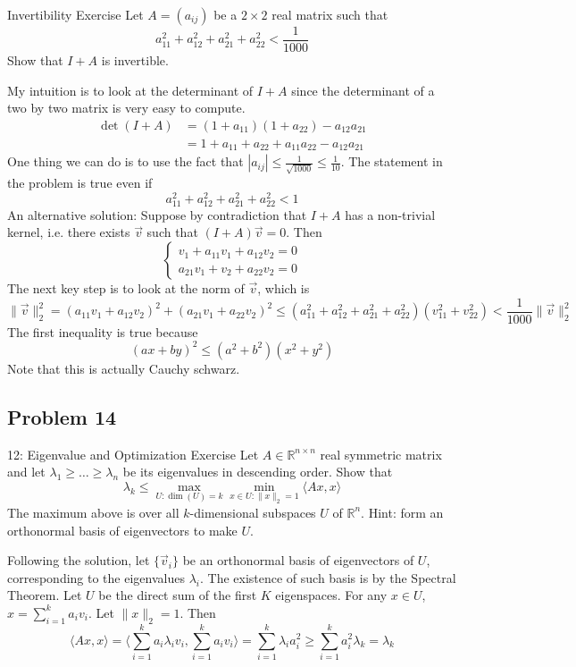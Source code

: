 \documentclass[../main]{subfiles}
\begin{document}
\begin{bbox}{Invertibility Exercise}
    Let $A = (a_{ij})$ be a $2\times 2$ real matrix such that 
    \[
    a_{11}^2 + a_{12}^2 + a_{21}^2 + a_{22}^2 < \frac{1}{1000}
    \]
    Show that $I + A$ is invertible.
\end{bbox}
\begin{solution}
    My intuition is to look at the determinant of $I + A$ since the determinant of a two by two matrix is very easy to compute.
    \begin{align*}
    \det(I+A) &= (1+a_{11})(1+a_{22})-a_{12}a_{21}\\
    &=1 + a_{11}+ a_{22}+a_{11}a_{22}-a_{12}a_{21}
    \end{align*}
    One thing we can do is to use the fact that $|a_{ij}|\leq \frac{1}{\sqrt{1000}}\le \frac{1}{10}$. The statement in the problem is true even if \[
     a_{11}^2 + a_{12}^2 + a_{21}^2 + a_{22}^2 < 1
    \]
    \newline
    An alternative solution: Suppose by contradiction that $I+A$ has a non-trivial kernel, i.e. there exists $\vec v$ such that $(I+A)\vec v = 0$. Then 
    \[
    \begin{cases}
        v_1 + a_{11} v_1 + a_{12}v_2 = 0\\
        a_{21}v_1 + v_2 + a_{22}v_2 = 0
    \end{cases}
    \]
    The next key step is to look at the norm of $\vec v$, which is 
    \[
    \|\vec v\|^2_2 = (a_{11}v_1 + a_{12}v_2)^2 +(a_{21}v_1 + a_{22}v_2)^2 \leq (a_{11}^2 + a_{12}^2 + a_{21}^2 + a_{22}^2)(v_{11}^2 + v_{22}^2) < \frac{1}{1000}\|\vec v\|_2^2
    \]
    The first inequality is true because 
    \[
    (ax+by)^2 \leq (a^2+b^2)(x^2+y^2)
    \]
    Note that this is actually Cauchy schwarz.
\end{solution}

\subsection{Problem 14}

\begin{bbox}{12: Eigenvalue and Optimization Exercise}
    Let $A\in \mathbb R^{n\times n}$ real symmetric matrix and let $\lambda_1\ge \dots \ge \lambda_n$ be its eigenvalues in descending order. Show that 
    \[
    \lambda_k \le \max_{U: \dim(U) = k}\min_{x\in U: \|x\|_2 = 1} \langle Ax, x\rangle
    \]
    The maximum above is over all $k$-dimensional subspaces $U$ of $\mathbb R^n$. Hint: form an orthonormal basis of eigenvectors to make $U$.
\end{bbox}
\begin{solution}
    Following the solution, let $\{\vec v_i\}$ be an orthonormal basis of eigenvectors of $U$, corresponding to the eigenvalues $\lambda_i$. The existence of such basis is by the Spectral Theorem.
    Let $U$ be the direct sum of the first $K$ eigenspaces. For any $x\in U$, $x = \sum_{i=1}^k a_i v_i$.
    Let $\|x\|_2 = 1$. Then 
    \[
    \langle Ax, x\rangle = \langle \sum^k_{i=1} a_i \lambda_i v_i, \sum_{i=1}^k a_i v_i\rangle = \sum_{i=1}^k \lambda_i a_i^2 \ge \sum_{i=1}^k a_i^2\lambda_k = \lambda_k
    \]
\end{solution}
\end{document}
